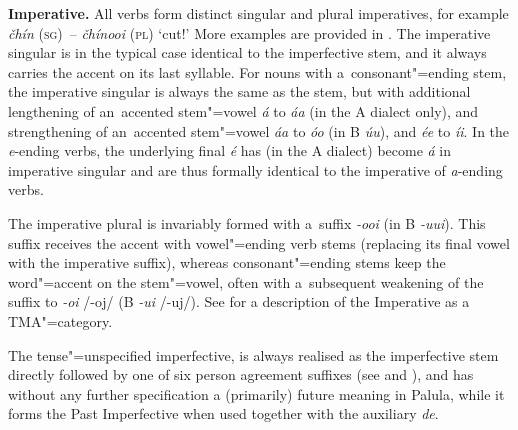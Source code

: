 \textbf{Imperative.} All verbs form distinct singular and plural imperatives, for example \textit{čhín} \textsc{(sg)}~-- \textit{čhínooi} (\textsc{pl}) `cut!' More examples are provided in . The imperative singular is in the typical case identical to the imperfective stem, and it always carries the accent on its last syllable. For nouns with a~consonant"=ending stem, the imperative singular is always the same as the stem, but with additional lengthening of an~accented stem"=vowel \textit{á} to \textit{áa} (in the A dialect only), and strengthening of an~accented stem"=vowel \textit{áa} to \textit{óo} (in B \textit{úu}), and \textit{ée} to \textit{íi}. In the \textit{e}-ending verbs, the underlying final \textit{é} has (in the A dialect) become \textit{á} in imperative singular and are thus formally identical to the imperative of \textit{a}-ending verbs.

The imperative plural is invariably formed with a~suffix \textit{-ooi} (in B \textit{-uui}). This suffix receives the accent with vowel"=ending verb stems (replacing its final vowel with the imperative suffix), whereas consonant"=ending stems keep the word"=accent on the stem"=vowel, often with a~subsequent weakening of the suffix to \textit{-oi} /-oj/ (B \textit{-ui} /-uj/). See  for a description of the Imperative as a TMA"=category.


 The tense"=unspecified imperfective, is always realised as the
imperfective stem directly followed by one of six person agreement suffixes (see
 and ), and has without any further specification a (primarily) future meaning in Palula, while it forms the Past Imperfective when used together with the auxiliary \textit{de}.


